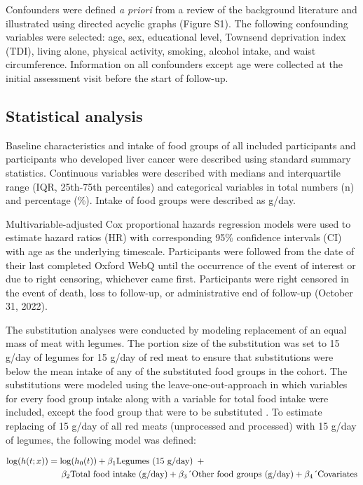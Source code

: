 \documentclass[nutrients,article,submit,moreauthors,pdftex]{Definitions/mdpi}
\begin{document}
Confounders were defined \emph{a priori} from a review of the background
literature and illustrated using directed acyclic graphs (Figure S1).
The following confounding variables were selected: age, sex, educational
level, Townsend deprivation index (TDI), living alone, physical
activity, smoking, alcohol intake, and waist circumference. Information
on all confounders except age were collected at the initial assessment
visit before the start of follow-up.

\hypertarget{subsec6}{%
\subsection{Statistical analysis}\label{subsec6}}

Baseline characteristics and intake of food groups of all included
participants and participants who developed liver cancer were described
using standard summary statistics. Continuous variables were described
with medians and interquartile range (IQR, 25th-75th percentiles) and
categorical variables in total numbers (n) and percentage (\%). Intake of
food groups were described as g/day.

Multivariable-adjusted Cox proportional hazards regression models were
used to estimate hazard ratios (HR) with corresponding 95\% confidence
intervals (CI) with age as the underlying timescale. Participants were
followed from the date of their last completed Oxford WebQ until the
occurrence of the event of interest or due to right censoring, whichever
came first. Participants were right censored in the event of death, loss
to follow-up, or administrative end of follow-up (October 31, 2022).

The substitution analyses were conducted by modeling replacement of an
equal mass of meat with legumes. The portion size of the substitution
was set to 15 g/day of legumes for 15 g/day of red meat to ensure that
substitutions were below the mean intake of any of the substituted food
groups in the cohort. The substitutions were modeled using the
leave-one-out-approach in which variables for every food group intake
along with a variable for total food intake were included, except the
food group that were to be substituted \citep{Ibsen2021}. To estimate
replacing of 15 g/day of all red meats (unprocessed and processed) with
15 g/day of legumes, the following model was defined:

{\small
\begin{align}
\log(h(t;x)) &= \log(h_0(t)) + \beta_1 \text{Legumes (15 g/day)} \hspace{0.5em} + \nonumber \\
&\quad \hspace{0.5em} \beta_2 \text{Total food intake (g/day)} + \beta_3 \text{´Other food groups (g/day)} + \beta_4 \text{´Covariates}
\end{align}
}
\end{document}
